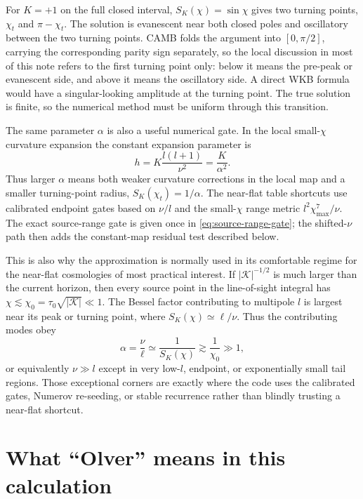 \documentclass[11pt,a4paper]{article}
\newcommand{\SK}{S_K}
\newcommand{\abs}[1]{\left|#1\right|}
\begin{document}
For \(K=+1\) on the full closed interval, \(\SK(\chi)=\sin\chi\) gives two
turning points, \(\chi_t\) and \(\pi-\chi_t\).  The solution is evanescent near
both closed poles and oscillatory between the two turning points.  CAMB folds
the argument into \([0,\pi/2]\), carrying the corresponding parity sign
separately, so the local discussion in most of this note refers to the first
turning point only: below it means the pre-peak or evanescent side, and above it
means the oscillatory side.  A direct WKB formula would have a singular-looking
amplitude at the turning point.  The true solution is finite, so the numerical
method must be uniform through this transition.

The same parameter \(\alpha\) is also a useful numerical gate.  In the local
small-\(\chi\) curvature expansion the constant expansion parameter is
\begin{equation}
  h=K\frac{l(l+1)}{\nu^2}=\frac{K}{\alpha^2}.
\end{equation}
Thus larger \(\alpha\) means both weaker curvature corrections in the local map
and a smaller turning-point radius, \(\SK(\chi_t)=1/\alpha\).  The near-flat
table shortcuts use calibrated endpoint gates based on \(\nu/l\) and the
small-\(\chi\) range metric \(l^2\chi_{\max}^7/\nu\).  The exact source-range
gate is given once in \eqref{eq:source-range-gate}; the shifted-\(\nu\) path then
adds the constant-map residual test described below.

This is also why the approximation is normally used in its comfortable regime
for the near-flat cosmologies of most practical interest.  If
\(\abs{\mathcal K}^{-1/2}\) is much larger than the current horizon, then every
source point in the line-of-sight integral has
\(\chi\lesssim \chi_0=\tau_0\sqrt{\abs{\mathcal K}}\ll1\).  The Bessel factor
contributing to multipole \(l\) is largest near its peak or turning point, where
\(\SK(\chi)\simeq \ell/\nu\).  Thus the contributing modes obey
\begin{equation}
  \alpha=\frac{\nu}{\ell}\simeq \frac{1}{\SK(\chi)}
  \gtrsim \frac{1}{\chi_0}\gg1,
\end{equation}
or equivalently \(\nu\gg l\) except in very low-\(l\), endpoint, or exponentially
small tail regions.  Those exceptional corners are exactly where the code uses
the calibrated gates, Numerov re-seeding, or stable recurrence rather than
blindly trusting a near-flat shortcut.

\section{What ``Olver'' means in this calculation}
\label{sec:olver-meaning}
\end{document}
